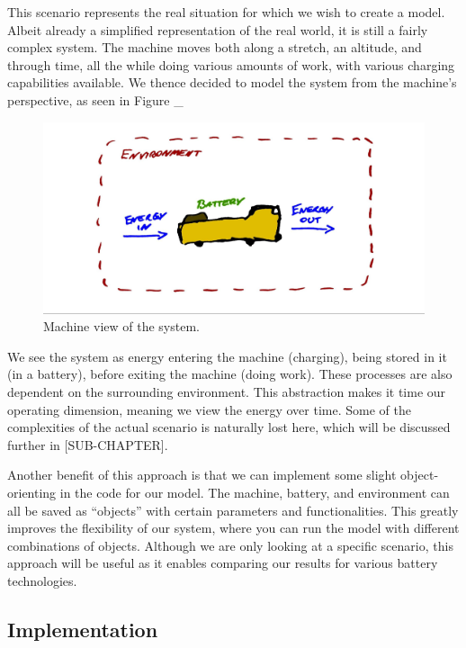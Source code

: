 \documentclass{article}
\begin{document}
This scenario represents the real situation for which we wish to create a model. Albeit already a simplified representation of the real world, it is still a fairly complex system. The machine moves both along a stretch, an altitude, and through time, all the while doing various amounts of work, with various charging capabilities available. We thence decided to model the system from the machine’s perspective, as seen in Figure \_ 

\begin{figure}[H]
    \centering
    \includegraphics*[width=1\textwidth]{img/image5.jpg}
    \caption{Machine view of the system.}
\end{figure}

We see the system as energy entering the machine (charging), being stored in it (in a battery), before exiting the machine (doing work). These processes are also dependent on the surrounding environment. This abstraction makes it time our operating dimension, meaning we view the energy over time. Some of the complexities of the actual scenario is naturally lost here, which will be discussed further in [SUB-CHAPTER].

Another benefit of this approach is that we can implement some slight object-orienting in the code for our model. The machine, battery, and environment can all be saved as “objects” with certain parameters and functionalities. This greatly improves the flexibility of our system, where you can run the model with different combinations of objects. Although we are only looking at a specific scenario, this approach will be useful as it enables comparing our results for various battery technologies.

\subsection{Implementation}
\end{document}
